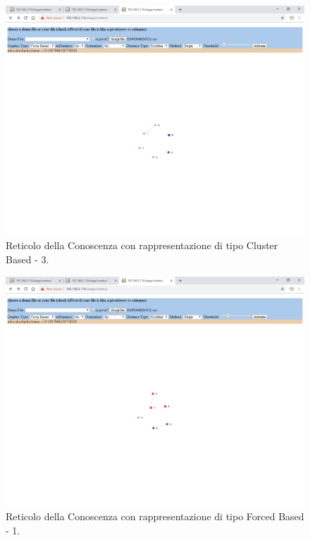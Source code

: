 \noindent
\begin{figure}[H]
\centering
	\includegraphics[width=1\linewidth]{./image/reticoloNonCorretto4.png}
	\caption{Reticolo della Conoscenza con rappresentazione di tipo Cluster Based - 3.}
	\label{Reticolo della Conoscenza con rappresentazione di tipo Cluster Based - 3.}
\end{figure}
\noindent
\begin{figure}[H]
\centering
	\includegraphics[width=1\linewidth]{./image/reticoloNonCorretto5.png}
	\caption{Reticolo della Conoscenza con rappresentazione di tipo Forced Based - 1.}
	\label{Reticolo della Conoscenza con rappresentazione di tipo Forced Based - 1.}
\end{figure}

